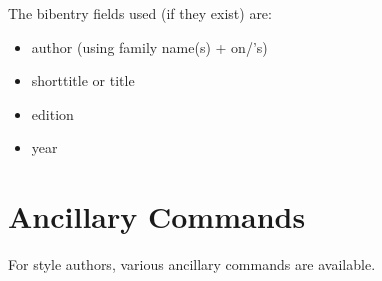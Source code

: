 \p The bibentry fields used (if they exist) are:
\begin{itemize}
\item author (using family name(s) + on/'s)
\item shorttitle or title
\item edition
\item year
\end{itemize}
%



%

\section{Ancillary Commands}
\p For style authors, various ancillary commands are available.
